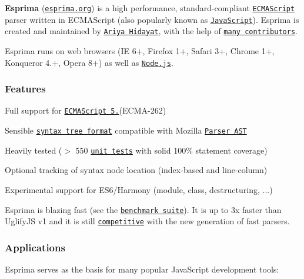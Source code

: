 {\bfseries Esprima} (\href{http://esprima.org}{\tt esprima.\+org}) is a high performance, standard-\/compliant \href{http://www.ecma-international.org/publications/standards/Ecma-262.htm}{\tt E\+C\+M\+A\+Script} parser written in E\+C\+M\+A\+Script (also popularly known as \href{http://en.wikipedia.org/wiki/JavaScript>JavaScript}{\tt Java\+Script}). Esprima is created and maintained by \href{http://twitter.com/ariyahidayat}{\tt Ariya Hidayat}, with the help of \href{https://github.com/ariya/esprima/contributors}{\tt many contributors}.

Esprima runs on web browsers (IE 6+, Firefox 1+, Safari 3+, Chrome 1+, Konqueror 4.+, Opera 8+) as well as \href{http://nodejs.org}{\tt Node.\+js}.

\subsubsection*{Features}


\begin{DoxyItemize}
\item Full support for \href{http://www.ecma-international.org/publications/standards/Ecma-262.htm}{\tt E\+C\+M\+A\+Script 5.}(E\+C\+M\+A-\/262)
\item Sensible \href{http://esprima.org/doc/index.html#ast}{\tt syntax tree format} compatible with Mozilla \href{https://developer.mozilla.org/en/SpiderMonkey/Parser_API}{\tt Parser A\+ST}
\item Heavily tested ($>$ 550 \href{http://esprima.org/test/}{\tt unit tests} with solid 100\% statement coverage)
\item Optional tracking of syntax node location (index-\/based and line-\/column)
\item Experimental support for E\+S6/\+Harmony (module, class, destructuring, ...)
\end{DoxyItemize}

Esprima is blazing fast (see the \href{http://esprima.org/test/benchmarks.html}{\tt benchmark suite}). It is up to 3x faster than Uglify\+JS v1 and it is still \href{http://esprima.org/test/compare.html}{\tt competitive} with the new generation of fast parsers.

\subsubsection*{Applications}

Esprima serves as the basis for many popular Java\+Script development tools\+:


